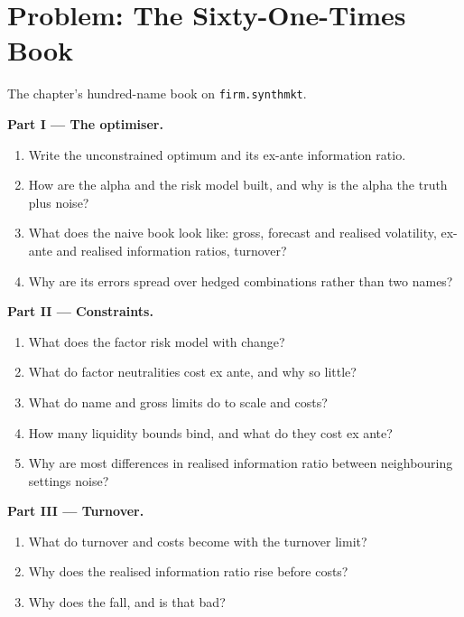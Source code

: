 \section{Problem: The Sixty-One-Times Book}

\begin{problem}\label{pb:rs:portfolio-construction-i:1}
The chapter's hundred-name book on \texttt{firm.synthmkt}.

\medskip\noindent\textbf{Part I --- The optimiser.}
\begin{enumerate}
\item Write the unconstrained optimum and its ex-ante information ratio.
\item How are the alpha and the risk model built, and why is the alpha the truth plus noise?
\item What does the naive book look like: gross, forecast and realised volatility, ex-ante and realised information ratios, turnover?
\item Why are its errors spread over hedged combinations rather than two names?
\end{enumerate}

\medskip\noindent\textbf{Part II --- Constraints.}
\begin{enumerate}[resume]
\item What does the factor risk model with  change?
\item What do factor neutralities cost ex ante, and why so little?
\item What do name and gross limits do to scale and costs?
\item How many liquidity bounds bind, and what do they cost ex ante?
\item Why are most differences in realised information ratio between neighbouring settings noise?
\end{enumerate}

\medskip\noindent\textbf{Part III --- Turnover.}
\begin{enumerate}[resume]
\item What do turnover and costs become with the turnover limit?
\item Why does the realised information ratio rise before costs?
\item Why does the  fall, and is that bad?
\end{enumerate}


\end{problem}
